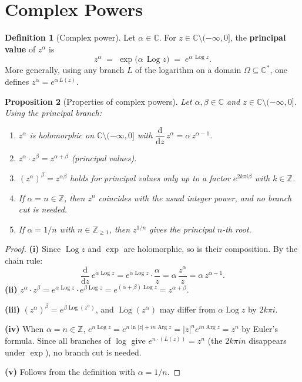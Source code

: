\documentclass[12pt,a4paper,openany]{book}
\theoremstyle{definition}
\newtheorem{definition}{Definition}[chapter]
\theoremstyle{plain}
\newtheorem{proposition}[definition]{Proposition}
\theoremstyle{remark}
\newcommand{\C}{\mathbb{C}}
\newcommand{\Z}{\mathbb{Z}}
\DeclareMathOperator{\Arg}{Arg}
\DeclareMathOperator{\Log}{Log}
\newcommand{\dd}{\mathrm{d}}
\newcommand{\abs}[1]{\left|#1\right|}
\begin{document}
\section{Complex Powers}
\label{sec:complex-powers}

\begin{definition}[Complex power]\label{def:complex-power}
Let $\alpha\in\C$.  For $z\in\C\setminus(-\infty,0]$, the
\textbf{principal value} of $z^\alpha$ is
\[
  z^\alpha \;=\; \exp\!\bigl(\alpha\,\Log z\bigr)
           \;=\; e^{\alpha\,\Log z}.
\]
More generally, using any branch $L$ of the logarithm on a domain
$\Omega\subseteq\C^*$, one defines $z^\alpha = e^{\alpha\, L(z)}$.
\end{definition}

\begin{proposition}[Properties of complex powers]\label{prop:powers-properties}
Let $\alpha,\beta\in\C$ and $z\in\C\setminus(-\infty,0]$.  Using the principal
branch:
\begin{enumerate}[label=\textup{(\roman*)}]
  \item $z^\alpha$ is holomorphic on $\C\setminus(-\infty,0]$ with
    $\dfrac{\dd}{\dd z}\,z^\alpha = \alpha\, z^{\alpha-1}$.
  \item $z^\alpha \cdot z^\beta = z^{\alpha+\beta}$ (principal values).
  \item $(z^\alpha)^\beta = z^{\alpha\beta}$ holds for principal values
    only up to a factor $e^{2k\pi i\beta}$ with $k\in\Z$.
  \item If $\alpha = n\in\Z$, then $z^n$ coincides with the usual
    integer power, and no branch cut is needed.
  \item If $\alpha = 1/n$ with $n\in\Z_{\ge 1}$, then $z^{1/n}$ gives
    the principal $n$-th root.
\end{enumerate}
\end{proposition}

\begin{proof}
\textbf{(i)} Since $\Log z$ and $\exp$ are holomorphic, so is their composition.
By the chain rule:
\[
  \frac{\dd}{\dd z}\,e^{\alpha\Log z}
  = e^{\alpha\Log z}\cdot\frac{\alpha}{z}
  = \alpha\,\frac{z^\alpha}{z}
  = \alpha\,z^{\alpha-1}.
\]
\textbf{(ii)}
$z^\alpha\cdot z^\beta = e^{\alpha\Log z}\cdot e^{\beta\Log z}
= e^{(\alpha+\beta)\Log z} = z^{\alpha+\beta}$.

\textbf{(iii)} $(z^\alpha)^\beta = e^{\beta\Log(z^\alpha)}$, and
$\Log(z^\alpha)$ may differ from $\alpha\Log z$ by $2k\pi i$.

\textbf{(iv)} When $\alpha=n\in\Z$, $e^{n\Log z} = e^{n\ln\abs{z}+in\Arg z}
= \abs{z}^n e^{in\Arg z} = z^n$ by Euler's formula.  Since all branches of $\log$
give $e^{n\cdot(L(z))}=z^n$ (the $2k\pi i n$ disappears under $\exp$), no branch
cut is needed.

\textbf{(v)} Follows from the definition with $\alpha = 1/n$.
\end{proof}
\end{document}
